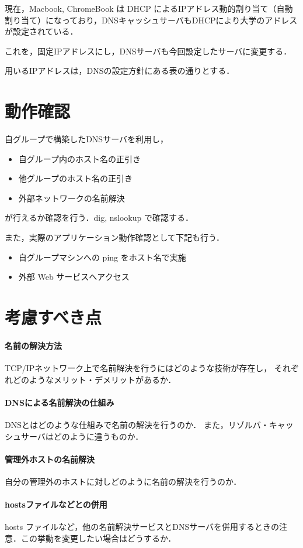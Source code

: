 現在，Macbook, ChromeBook は DHCP によるIPアドレス動的割り当て（自動割り当て）になっており，DNSキャッシュサーバもDHCPにより大学のアドレスが設定されている．

これを，固定IPアドレスにし，DNSサーバも今回設定したサーバに変更する．

用いるIPアドレスは，DNSの設定方針にある表の通りとする．


\section{動作確認}
 自グループで構築したDNSサーバを利用し，
 \begin{itemize}
     \item 自グループ内のホスト名の正引き
     \item 他グループのホスト名の正引き
     \item 外部ネットワークの名前解決
 \end{itemize}
 が行えるか確認を行う．dig, nslookup で確認する．

また，実際のアプリケーション動作確認として下記も行う．
 \begin{itemize}
     \item 自グループマシンへの ping をホスト名で実施
     \item 外部 Web サービスへアクセス
 \end{itemize}

 
\section{考慮すべき点}
\paragraph{名前の解決方法}
			TCP/IPネットワーク上で名前解決を行うにはどのような技術が存在し，
			それぞれどのようなメリット・デメリットがあるか．
\paragraph{DNSによる名前解決の仕組み}
		DNSとはどのような仕組みで名前の解決を行うのか．
		また，リゾルバ・キャッシュサーバはどのように違うものか．
\paragraph{管理外ホストの名前解決}
		自分の管理外のホストに対しどのように名前の解決を行うのか．
\paragraph{hostsファイルなどとの併用}
	hosts ファイルなど，他の名前解決サービスとDNSサーバを併用するときの注意．この挙動を変更したい場合はどうするか．
 
